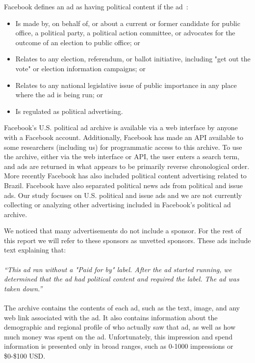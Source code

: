 \documentclass[fleqn,10pt]{wlscirep}
\begin{document}
Facebook defines an ad as having political content if the ad~\cite{FB_political}:
\begin{itemize}
\item Is made by, on behalf of, or about a current or former candidate for public office, a political party, a political action committee, or advocates for the outcome of an election to public office; or

\item Relates to any election, referendum, or ballot initiative, including "get out the vote" or election information campaigns; or

\item Relates to any national legislative issue of public importance in any place where the ad is being run; or

\item Is regulated as political advertising.
\end{itemize}

Facebook's U.S. political ad archive is available via a web interface by anyone with a Facebook account. Additionally, Facebook has made an API available to some researchers (including us) for programmatic access to this archive. To use the archive, either via the web interface or API, the user enters a search term, and ads are returned in what appears to be primarily reverse chronological order. More recently Facebook has also included political content advertising related to Brazil. Facebook have also separated political news ads from political and issue ads. Our study focuses on U.S. political and issue ads and we are not currently collecting or analyzing other advertising included in Facebook's political ad archive. 

We noticed that many advertisements do not include a sponsor. For the rest of this report we will refer to these sponsors as unvetted sponsors. These ads include text explaining that:
\\
\\
\noindent\textit{``This ad ran without a "Paid for by" label. After the ad started running, we determined that the ad had political content and required the label. The ad was taken down.''} 
\\
\\

The archive contains the contents of each ad, such as the text, image, and any web link associated with the ad. It also contains information about the demographic and regional profile of who actually saw that ad, as well as how much money was spent on the ad. Unfortunately, this impression and spend information is presented only in broad ranges, such as 0-1000 impressions or \$0-\$100 USD. 
\end{document}
